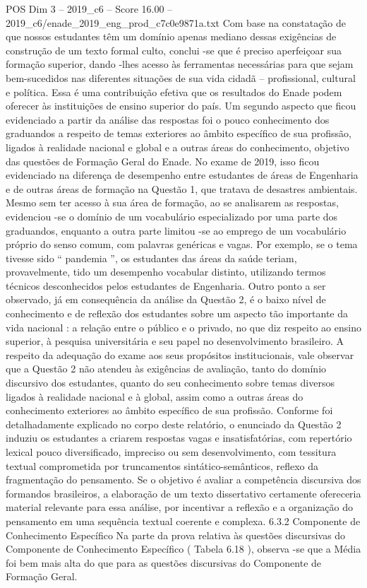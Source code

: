 \begin{textsample}{POS Dim 3 – 2019\_c6 – Score 16.00 – 2019\_c6/enade\_2019\_eng\_prod\_c7c0e9871a.txt}
Com base na constatação de que nossos estudantes têm um domínio apenas mediano dessas exigências de construção de um texto formal culto, conclui -se que é preciso aperfeiçoar sua formação superior, dando -lhes acesso às ferramentas necessárias para que sejam bem-sucedidos nas diferentes situações de sua vida cidadã – profissional, cultural e política.
Essa é uma contribuição efetiva que os resultados do Enade podem oferecer às instituições de ensino superior do país.
Um segundo aspecto que ficou evidenciado a partir da análise das respostas foi o pouco conhecimento dos graduandos a respeito de temas exteriores ao âmbito específico de sua profissão, ligados à realidade nacional e global e a outras áreas do conhecimento, objetivo das questões de Formação Geral do Enade.
No exame de 2019, isso ficou evidenciado na diferença de desempenho entre estudantes de áreas de Engenharia e de outras áreas de formação na Questão 1, que tratava de desastres ambientais.
Mesmo sem ter acesso à sua área de formação, ao se analisarem as respostas, evidenciou -se o domínio de um vocabulário especializado por uma parte dos graduandos, enquanto a outra parte limitou -se ao emprego de um vocabulário próprio do senso comum, com palavras genéricas e vagas.
Por exemplo, se o tema tivesse sido “ pandemia ”, os estudantes das áreas da saúde teriam, provavelmente, tido um desempenho vocabular distinto, utilizando termos técnicos desconhecidos pelos estudantes de Engenharia.
Outro ponto a ser observado, já em consequência da análise da Questão 2, é o baixo nível de conhecimento e de reflexão dos estudantes sobre um aspecto tão importante da vida nacional : a relação entre o público e o privado, no que diz respeito ao ensino superior, à pesquisa universitária e seu papel no desenvolvimento brasileiro.
A respeito da adequação do exame aos seus propósitos institucionais, vale observar que a Questão 2 não atendeu às exigências de avaliação, tanto do domínio discursivo dos estudantes, quanto do seu conhecimento sobre temas diversos ligados à realidade nacional e à global, assim como a outras áreas do conhecimento exteriores ao âmbito específico de sua profissão.
Conforme foi detalhadamente explicado no corpo deste relatório, o enunciado da Questão 2 induziu os estudantes a criarem respostas vagas e insatisfatórias, com repertório lexical pouco diversificado, impreciso ou sem desenvolvimento, com tessitura textual comprometida por truncamentos sintático-semânticos, reflexo da fragmentação do pensamento.
Se o objetivo é avaliar a competência discursiva dos formandos brasileiros, a elaboração de um texto dissertativo certamente ofereceria material relevante para essa análise, por incentivar a reflexão e a organização do pensamento em uma sequência textual coerente e complexa. 6.3.2 Componente de Conhecimento Específico Na parte da prova relativa às questões discursivas do Componente de Conhecimento Específico ( Tabela 6.18 ), observa -se que a Média foi bem mais alta do que para as questões discursivas do Componente de Formação Geral.

\end{textsample}

